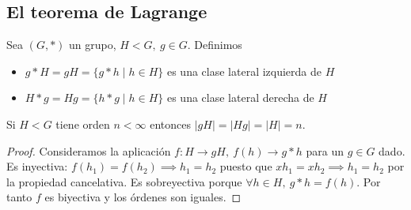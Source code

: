 \documentclass{book}
\newtheorem{pro}{Proposición}
\theoremstyle{definition}
\theoremstyle{remark}
\newcommand{\uds}[1]{\mathcal{U}(#1)}
\newcommand{\Z}{\mathbb{Z}}
\newcommand{\ZnZ}{\mathbb{Z}/n\mathbb{Z}}
\begin{document}
%


\subsection{El teorema de Lagrange}

\begin{dfn}
	Sea $(G, \ast)$ un grupo, $H < G,\ g \in G$. Definimos
	\begin{itemize}
		\item $g \ast H = gH = \{g \ast h \mid h \in H\}$ es una clase lateral izquierda de $H$
		\item $H \ast g = Hg = \{h \ast g \mid h \in H\}$ es una clase lateral derecha de $H$
	\end{itemize}
\end{dfn}

\begin{thm}
	\label{thm:ordencajaslaterales}
	Si $H < G$ tiene orden $n < \infty$ entonces $|gH| = |Hg| = |H| = n$.
\end{thm}

\begin{proof}
	Consideramos la aplicación $f: H \to gH,\ f(h) \to g\ast h$ para un $g \in G$ dado. Es inyectiva: $f(h_1) = f(h_2) \implies h_1 = h_2$ puesto que $xh_1 = xh_2 \implies h_1 = h_2$ por la propiedad cancelativa. Es sobreyectiva porque $\forall h \in H,\ g \ast h = f(h)$. Por tanto $f$ es biyectiva y los órdenes son iguales.
\end{proof}
\end{document}
